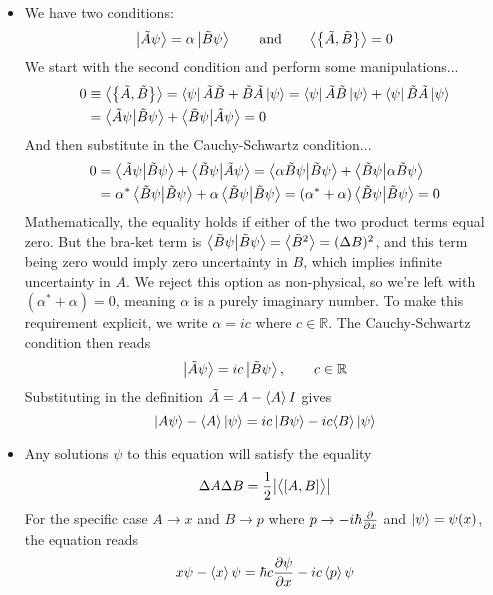 \documentclass[11pt, a4paper]{article}
\newcommand{\eqtext}[1]{\qquad \text{#1} \qquad}
\newcommand{\evb}[1]{\big \langle {#1} \big \rangle}  %
\begin{document}
\begin{itemize}
	\item We have two conditions:
	\begin{equation*}
		\ket{\tilde{A}\psi} = \alpha \ket{\tilde{B}\psi} \eqtext{and} \big\langle \big\{\tilde{A}, \tilde{B}\big\} \big\rangle = 0
	\end{equation*}
	We start with the second condition and perform some manipulations... 
	\begin{align*}
		0 &\equiv \evb{\big\{\tilde{A}, \tilde{B}\big\}} = \bra{\psi}\tilde{A}\tilde{B} + \tilde{B} \tilde{A} \ket{\psi} = \bra{\psi}\tilde{A}\tilde{B} \ket{\psi} + \bra{\psi}\tilde{B} \tilde{A} \ket{\psi}\\
		&= \braket{\tilde{A}\psi}{\tilde{B}\psi} + \braket{\tilde{B}\psi}{\tilde{A}\psi} = 0
	\end{align*}
	And then substitute in the Cauchy-Schwartz condition...
	\begin{align*}
		0 &= \braket{\tilde{A}\psi}{\tilde{B}\psi} + \braket{\tilde{B}\psi}{\tilde{A}\psi} = \braket{\alpha \tilde{B}\psi}{\tilde{B}\psi} + \braket{\tilde{B}\psi}{\alpha \tilde{B}\psi} \\
		& = \alpha^{*}\braket{ \tilde{B}\psi}{\tilde{B}\psi} + \alpha\braket{\tilde{B}\psi}{\tilde{B}\psi} = (\alpha^{*} + \alpha)\braket{\tilde{B}\psi}{\tilde{B}\psi} = 0
	\end{align*}
	Mathematically, the equality holds if either of the two product terms equal zero. But the bra-ket term is $ \braket{\tilde{B}\psi}{\tilde{B}\psi} = \big \langle \tilde{B}^{2} \big \rangle = (\Delta B)^{2}$, and this term being zero would imply zero uncertainty in $ B $, which implies infinite uncertainty in $ A $. We reject this option as non-physical, so we're left with $ (\alpha^{*} + \alpha) = 0 $, meaning $ \alpha $ is a purely imaginary number. To make this requirement explicit, we write $ \alpha = i c $ where $ c \in \mathbb{R} $. The Cauchy-Schwartz condition then reads 
	\begin{equation*}
		\ket{\tilde{A}\psi} = i c \ket{\tilde{B}\psi}, \qquad c \in \mathbb{R}
	\end{equation*}
	Substituting in the definition $ \tilde{A} = A - \expval{A}I $ gives
	\begin{equation*}
		\ket{A\psi} - \langle A \rangle\ket{\psi} = ic\ket{B\psi} - ic\langle B \rangle\ket{\psi}
	\end{equation*}
	
	\item Any solutions $ \psi $ to this equation will satisfy the equality
	\begin{equation*}
		  \Delta A \Delta B = \frac{1}{2}\abs{\big\langle [A, B] \big\rangle}
	\end{equation*}
	For the specific case $ A \to x $ and $ B \to p $ where $ p \to  - i \hbar \pdv{}{x} $ and $ \ket{\psi} = \psi(x) $, the equation reads
	\begin{equation*}
		x \psi - \expval{x} \psi = \hbar c \pdv{\psi}{x} - ic \expval{p} \psi
	\end{equation*}
\end{itemize}
\end{document}
